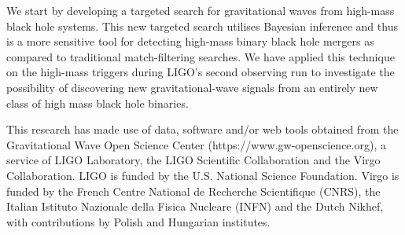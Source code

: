 \documentclass[%
preprint,
 amsmath,amssymb,
 aps,
]{revtex4}
\begin{document}
We start by developing a targeted search for gravitational waves from high-mass black hole systems. This new targeted search utilises Bayesian inference and thus is a more sensitive tool for detecting high-mass binary black hole mergers as compared to traditional match-filtering searches. We have applied this technique on the high-mass triggers during LIGO's second observing run to investigate the possibility of discovering new gravitational-wave signals from an entirely new class of high mass black hole binaries.

\begin{acknowledgments}

This research has made use of data, software and/or web tools obtained from the Gravitational Wave Open Science Center (https://www.gw-openscience.org), a service of LIGO Laboratory, the LIGO Scientific Collaboration and the Virgo Collaboration. LIGO is funded by the U.S. National Science Foundation. Virgo is funded by the French Centre National de Recherche Scientifique (CNRS), the Italian Istituto Nazionale della Fisica Nucleare (INFN) and the Dutch Nikhef, with contributions by Polish and Hungarian institutes.

\end{acknowledgments}



\end{document}
